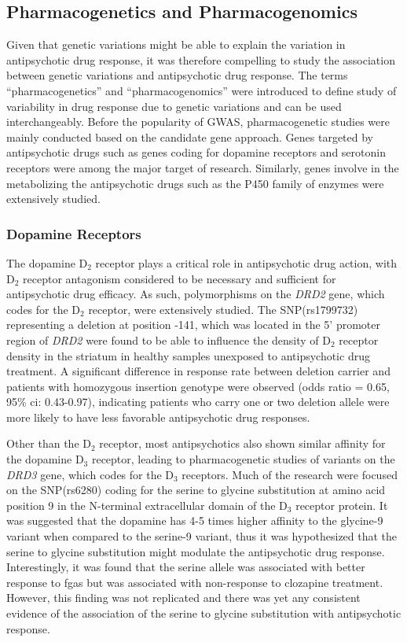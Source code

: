 	\subsection{Pharmacogenetics and Pharmacogenomics}
	Given that genetic variations might be able to explain the variation in antipsychotic drug response, it was therefore compelling to study the association between genetic variations and antipsychotic drug response.
	The terms ``pharmacogenetics'' and ``pharmacogenomics'' were introduced to define study of variability in drug response due to genetic variations and can be used interchangeably\citep{Pirmohamed2001}. 
	Before the popularity of \gls{GWAS}, pharmacogenetic studies were mainly conducted based on the candidate gene approach.
	Genes targeted by antipsychotic drugs such as genes coding for dopamine receptors and serotonin receptors were among the major target of research.
	Similarly, genes involve in the metabolizing the antipsychotic drugs such as the P450 family of enzymes were extensively studied.
	\subsubsection{Dopamine Receptors}
	The dopamine D$_2$ receptor plays a critical role in antipsychotic drug action, with D$_2$ receptor antagonism considered to be necessary and sufficient for antipsychotic drug efficacy\citep{Kapur2003}.
	As such, polymorphisms on the \textit{DRD2} gene, which codes for the D$_2$ receptor, were extensively studied. 
	The \gls{SNP}(rs1799732) representing a deletion at position -141, which was located in the 5' promoter region of \textit{DRD2} were found to be able to influence the density of D$_2$ receptor density in the striatum in healthy samples unexposed to antipsychotic drug treatment\citep{Arinami1997}.
	A significant difference in response rate between deletion carrier and patients with homozygous insertion genotype were observed (odds ratio = 0.65, 95\% \gls{ci}: 0.43-0.97), indicating patients who carry one or two deletion allele were more likely to have less favorable antipsychotic drug responses.

	Other than the D$_2$ receptor, most antipsychotics also shown similar affinity for the dopamine D$_3$ receptor\citep{Sokoloff2006}, leading to pharmacogenetic studies of variants on the \textit{DRD3} gene, which codes for the D$_3$ receptors.
	Much of the research were focused on the \gls{SNP}(rs6280) coding for the serine to glycine substitution at amino acid position 9 in the N-terminal extracellular domain of the D$_3$ receptor protein.
	It was suggested that the dopamine has 4-5 times higher affinity to the glycine-9 variant when compared to the serine-9 variant\citep{Jeanneteau2006}, thus it was hypothesized that the serine to glycine substitution might modulate the antipsychotic drug response. 
	Interestingly, it was found that the serine allele was associated with better response to \glspl{fga} but was associated with non-response to clozapine treatment\citep{Zhang2011}. 
	However, this finding was not replicated and there was yet any consistent evidence of the association of the serine to glycine substitution with antipsychotic response\citep{Zhang2011}.
	
